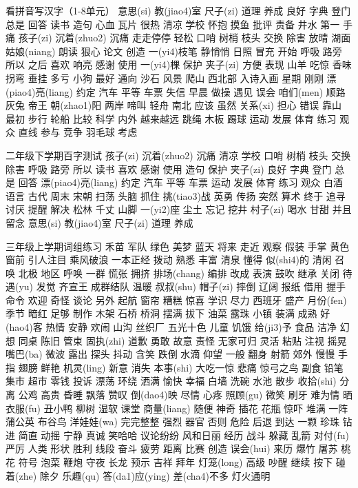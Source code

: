 \documentclass[a4paper]{article}
\begin{document}
看拼音写汉字（1-8单元）
意思(si) 教(jiao4)室 尺子(zi) 道理
养成 良好 字典 登门
总是 回答 读书 造句
心血 瓦片 很热 清凉
学校 怀抱 摸鱼 批评
责备 井水 第一 手痛
孩子(zi) 沉着(zhuo2) 沉痛 走走停停
轻松 口哨 树梢 枝头
交换 除害 放晴 湖面
姑娘(niang) 朗读 狠心 论文
创造 一(yi4)枝笔 静悄悄 日照
冒充 开始 呼吸 路旁
所以 之后 喜欢 响亮
感谢 使用 一(yi4)棵 保护
夹子(zi) 方便 表现 山羊
吃惊 香味 拐弯 垂挂
多亏 小狗 最好 通向
沙石 风景 爬山 西北部
入诗入画 星期 刚刚 漂(piao4)亮(liang)
约定 汽车 平等 车票
失信 早晨 做操 遇见
误会 咱们(men) 顺路 灰兔
帝王 朝(zhao1)阳 两岸 啼叫
轻舟 南北 应该 虽然
关系(xi) 担心 错误 靠山
最初 步行 轮船 比较
科学 内外 越来越远 跳绳
木板 踢球 运动 发展
体育 练习 观众 直线
参与 竞争 羽毛球 考虑

二年级下学期百字测试
孩子(zi) 沉着(zhuo2) 沉痛 清凉 学校
口哨 树梢 枝头 交换 除害
呼吸 路旁 所以 读书 喜欢
感谢 使用 造句 保护 夹子(zi)
良好 字典 登门 总是 回答
漂(piao4)亮(liang) 约定 汽车 平等 车票
运动 发展 体育 练习 观众
白酒 语言 古代 周末 宋朝
扫荡 头脑 抓住 挑(tiao3)战 英勇
传扬 突然 算术 终于 追寻
讨厌 提醒 解决 松林 千丈
山脚 一(yi2)座 尘土 忘记 挖井
村子(zi) 喝水 甘甜 并且 留念
意思(si) 教(jiao4)室 尺子(zi) 道理 养成

三年级上学期词组练习
禾苗 军队 绿色 美梦 蓝天 将来 走近 观察 假装 手掌 黄色 窗前 引人注目 乘风破浪 一本正经
拨动 熟悉 丰富 清泉 懂得 似(shi4)的 清闲 召唤 北极 地区 呼唤 一群 慌张 拥挤 排场(chang)
编排 改成 表演 鼓吹 继承 关闭 待遇(yu) 发觉 齐宣王 成群结队
温暖 叔叔(shu) 帽子(zi) 摔倒 辽阔 报纸 借用 握手 命令 欢迎 奇怪 谈论 另外 起航 窗帘
糟糕 惊喜 学识 尽力 西班牙 盛产 月份(fen) 季节 暗红 足够 制作 木架 石桥 桥洞 摆满 拔下
油菜 露珠 小镇 装满 成熟 好(hao4)客 热情 安静 欢闹 山沟 丝织厂 五光十色 儿童 饥饿
给(ji3)予 食品 洁净 幻想 同桌 陈旧 管束 固执(zhi) 道歉 勇敢 故意 责怪 无家可归
灵活 粘贴 注视 摇晃 嘴巴(ba) 微波 露出 探头 抖动 含笑 跌倒 水滴 仰望 一般 翻身 射箭
郊外 慢慢 手指 翅膀 鲜艳 机灵(ling) 新意 消失 本事(shi) 大吃一惊 悲痛 惊弓之鸟
副食 铅笔 集市 超市 零钱 投诉 漂荡 环绕 洒满 愉快 幸福 白墙 洗碗 水池 散步 收拾(shi)
分离 公鸡 高贵 昏睡 飘落 赞叹 倒(dao4)映 尽情 心疼 照顾(gu) 微笑 刷牙 难为情 晒衣服(fu)
丑小鸭 柳树 湿软 课堂 商量(liang) 随便 神奇 插花 花瓶 惊吓 堆满 一阵 蒲公英 布谷鸟
洋娃娃(wa) 完完整整 强烈 器官 否则 危险 后退 到达 一颗 珍珠 钻进 简直 动摇 宁静 真诚
笑哈哈 议论纷纷 风和日丽 经历 战斗 躲藏 乱箭 对付(fu) 严厉 人类 形状 胜利 线段 奋斗
疲劳 距离 比赛 创造 误会(hui) 来历 爆竹 屠苏 桃花 符号 泡菜 鞭炮 守夜 长龙 预示 吉祥
拜年 灯笼(long) 高级 吵醒 继续 按下 碰着(zhe) 除夕 乐趣(qu) 答(da1)应(ying)
差(cha4)不多 灯火通明
\end{document}
